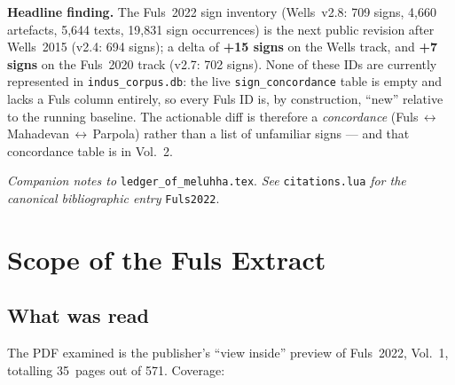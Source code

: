 \documentclass[12pt, a4paper]{article}
\newcommand{\db}[1]{\texttt{#1}}
\begin{document}
\begin{titlepage}
\begin{mdframed}[
  backgroundcolor=axiomfill,
  linecolor=axiomborder,
  linewidth=1pt,
  innerleftmargin=18pt,
  innerrightmargin=18pt,
  innertopmargin=14pt,
  innerbottommargin=14pt
]
\medskip
\noindent\textbf{Headline finding.}\enspace
The Fuls~2022 sign inventory (Wells~v2.8: 709 signs,
4,660 artefacts, 5,644 texts, 19,831 sign occurrences)
is the next public revision after Wells~2015 (v2.4: 694 signs);
a delta of \textbf{+15 signs} on the Wells track, and
\textbf{+7 signs} on the Fuls~2020 track (v2.7: 702 signs).
None of these IDs are currently represented in
\db{indus\_corpus.db}: the live \db{sign\_concordance} table is empty
and lacks a Fuls column entirely, so every Fuls ID is, by construction,
``new'' relative to the running baseline.
The actionable diff is therefore a \emph{concordance}
(Fuls\,$\leftrightarrow$\,Mahadevan\,$\leftrightarrow$\,Parpola)
rather than a list of unfamiliar signs --- and that concordance
table is in Vol.~2.
\end{mdframed}

\vfill
{\footnotesize\color{gray}
  \textit{Companion notes to} \texttt{ledger\_of\_meluhha.tex}.
  \textit{See} \texttt{citations.lua} \textit{for the canonical
  bibliographic entry} \texttt{Fuls2022}.
}
\end{titlepage}

\tableofcontents
\newpage

\section{Scope of the Fuls Extract}
\label{sec:scope}

\subsection{What was read}

The PDF examined is the publisher's
``view inside'' preview of Fuls~2022, Vol.~1, totalling 35~pages out of
571.  Coverage:
\end{document}
